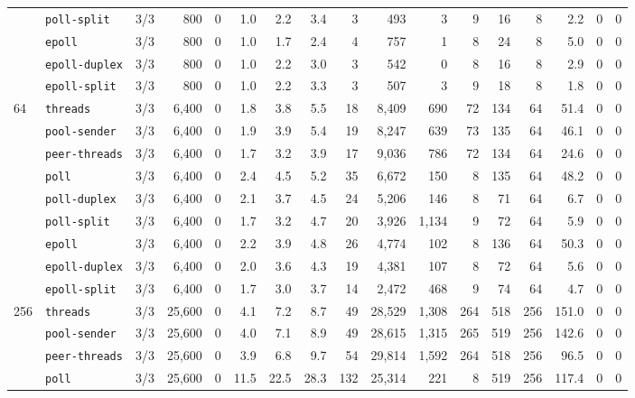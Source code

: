 \begin{longtable}{@{}llrrrrrrrrrrrrrrr@{}}
 & \texttt{poll-split} & 3/3 & 800 & 0 & 1.0 & 2.2 & 3.4 & 3 & 493 & 3 & 9 & 16 & 8 & 2.2 & 0 & 0 \\
 & \texttt{epoll} & 3/3 & 800 & 0 & 1.0 & 1.7 & 2.4 & 4 & 757 & 1 & 8 & 24 & 8 & 5.0 & 0 & 0 \\
 & \texttt{epoll-duplex} & 3/3 & 800 & 0 & 1.0 & 2.2 & 3.0 & 3 & 542 & 0 & 8 & 16 & 8 & 2.9 & 0 & 0 \\
 & \texttt{epoll-split} & 3/3 & 800 & 0 & 1.0 & 2.2 & 3.3 & 3 & 507 & 3 & 9 & 18 & 8 & 1.8 & 0 & 0 \\
\midrule
64 & \texttt{threads} & 3/3 & 6{,}400 & 0 & 1.8 & 3.8 & 5.5 & 18 & 8{,}409 & 690 & 72 & 134 & 64 & 51.4 & 0 & 0 \\
 & \texttt{pool-sender} & 3/3 & 6{,}400 & 0 & 1.9 & 3.9 & 5.4 & 19 & 8{,}247 & 639 & 73 & 135 & 64 & 46.1 & 0 & 0 \\
 & \texttt{peer-threads} & 3/3 & 6{,}400 & 0 & 1.7 & 3.2 & 3.9 & 17 & 9{,}036 & 786 & 72 & 134 & 64 & 24.6 & 0 & 0 \\
 & \texttt{poll} & 3/3 & 6{,}400 & 0 & 2.4 & 4.5 & 5.2 & 35 & 6{,}672 & 150 & 8 & 135 & 64 & 48.2 & 0 & 0 \\
 & \texttt{poll-duplex} & 3/3 & 6{,}400 & 0 & 2.1 & 3.7 & 4.5 & 24 & 5{,}206 & 146 & 8 & 71 & 64 & 6.7 & 0 & 0 \\
 & \texttt{poll-split} & 3/3 & 6{,}400 & 0 & 1.7 & 3.2 & 4.7 & 20 & 3{,}926 & 1{,}134 & 9 & 72 & 64 & 5.9 & 0 & 0 \\
 & \texttt{epoll} & 3/3 & 6{,}400 & 0 & 2.2 & 3.9 & 4.8 & 26 & 4{,}774 & 102 & 8 & 136 & 64 & 50.3 & 0 & 0 \\
 & \texttt{epoll-duplex} & 3/3 & 6{,}400 & 0 & 2.0 & 3.6 & 4.3 & 19 & 4{,}381 & 107 & 8 & 72 & 64 & 5.6 & 0 & 0 \\
 & \texttt{epoll-split} & 3/3 & 6{,}400 & 0 & 1.7 & 3.0 & 3.7 & 14 & 2{,}472 & 468 & 9 & 74 & 64 & 4.7 & 0 & 0 \\
\midrule
256 & \texttt{threads} & 3/3 & 25{,}600 & 0 & 4.1 & 7.2 & 8.7 & 49 & 28{,}529 & 1{,}308 & 264 & 518 & 256 & 151.0 & 0 & 0 \\
 & \texttt{pool-sender} & 3/3 & 25{,}600 & 0 & 4.0 & 7.1 & 8.9 & 49 & 28{,}615 & 1{,}315 & 265 & 519 & 256 & 142.6 & 0 & 0 \\
 & \texttt{peer-threads} & 3/3 & 25{,}600 & 0 & 3.9 & 6.8 & 9.7 & 54 & 29{,}814 & 1{,}592 & 264 & 518 & 256 & 96.5 & 0 & 0 \\
 & \texttt{poll} & 3/3 & 25{,}600 & 0 & 11.5 & 22.5 & 28.3 & 132 & 25{,}314 & 221 & 8 & 519 & 256 & 117.4 & 0 & 0 \\

\end{longtable}
